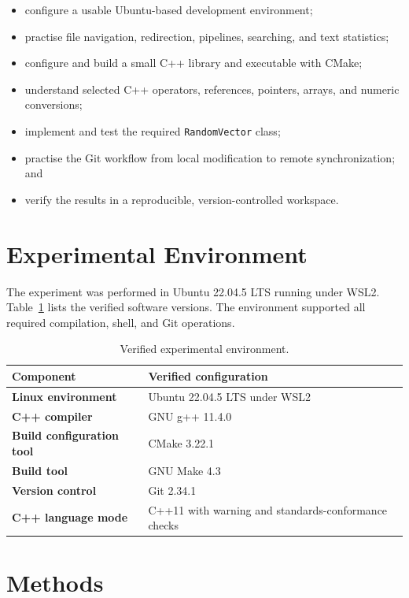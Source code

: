 \documentclass[11pt,a4paper]{article}
\begin{document}
\begin{itemize}
  \item configure a usable Ubuntu-based development environment;
  \item practise file navigation, redirection, pipelines, searching, and text statistics;
  \item configure and build a small C++ library and executable with CMake;
  \item understand selected C++ operators, references, pointers, arrays, and numeric conversions;
  \item implement and test the required \texttt{RandomVector} class;
  \item practise the Git workflow from local modification to remote synchronization; and
  \item verify the results in a reproducible, version-controlled workspace.
\end{itemize}

\section{Experimental Environment}

The experiment was performed in Ubuntu 22.04.5 LTS running under WSL2. Table~\ref{tab:environment} lists the verified software versions. The environment supported all required compilation, shell, and Git operations.

\begin{table}[H]
  \centering
  \caption{Verified experimental environment.}
  \label{tab:environment}
  \begin{tabularx}{\textwidth}{>{\bfseries}p{}X}
    \toprule
    Component & Verified configuration \\
    \midrule
    Linux environment & Ubuntu 22.04.5 LTS under WSL2 \\
    C++ compiler & GNU g++ 11.4.0 \\
    Build configuration tool & CMake 3.22.1 \\
    Build tool & GNU Make 4.3 \\
    Version control & Git 2.34.1 \\
    C++ language mode & C++11 with warning and standards-conformance checks \\
    \bottomrule
  \end{tabularx}
\end{table}

\section{Methods}
\end{document}
